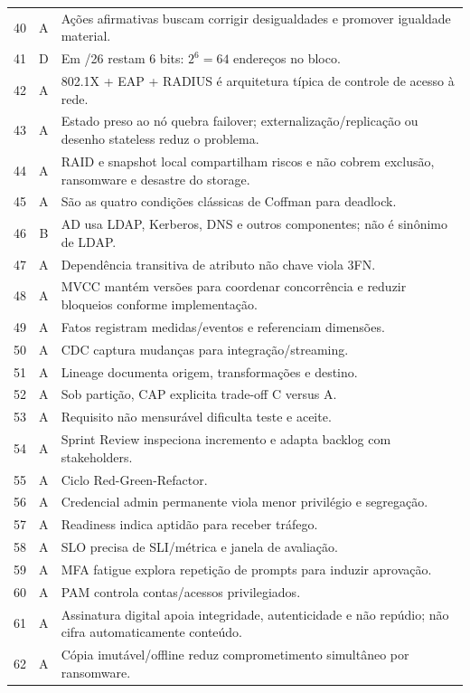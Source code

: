 \begin{longtable}{c c p{10.8cm}}
40 & A & Ações afirmativas buscam corrigir desigualdades e promover igualdade material. \\
41 & D & Em /26 restam 6 bits: $2^6=64$ endereços no bloco. \\
42 & A & 802.1X + EAP + RADIUS é arquitetura típica de controle de acesso à rede. \\
43 & A & Estado preso ao nó quebra failover; externalização/replicação ou desenho stateless reduz o problema. \\
44 & A & RAID e snapshot local compartilham riscos e não cobrem exclusão, ransomware e desastre do storage. \\
45 & A & São as quatro condições clássicas de Coffman para deadlock. \\
46 & B & AD usa LDAP, Kerberos, DNS e outros componentes; não é sinônimo de LDAP. \\
47 & A & Dependência transitiva de atributo não chave viola 3FN. \\
48 & A & MVCC mantém versões para coordenar concorrência e reduzir bloqueios conforme implementação. \\
49 & A & Fatos registram medidas/eventos e referenciam dimensões. \\
50 & A & CDC captura mudanças para integração/streaming. \\
51 & A & Lineage documenta origem, transformações e destino. \\
52 & A & Sob partição, CAP explicita trade-off C versus A. \\
53 & A & Requisito não mensurável dificulta teste e aceite. \\
54 & A & Sprint Review inspeciona incremento e adapta backlog com stakeholders. \\
55 & A & Ciclo Red-Green-Refactor. \\
56 & A & Credencial admin permanente viola menor privilégio e segregação. \\
57 & A & Readiness indica aptidão para receber tráfego. \\
58 & A & SLO precisa de SLI/métrica e janela de avaliação. \\
59 & A & MFA fatigue explora repetição de prompts para induzir aprovação. \\
60 & A & PAM controla contas/acessos privilegiados. \\
61 & A & Assinatura digital apoia integridade, autenticidade e não repúdio; não cifra automaticamente conteúdo. \\
62 & A & Cópia imutável/offline reduz comprometimento simultâneo por ransomware. \\

\end{longtable}
